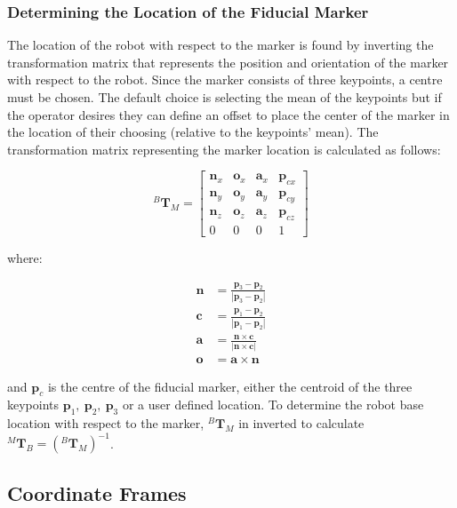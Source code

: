 \subsubsection{Determining the Location of the Fiducial Marker}

The location of the robot with respect to the marker is found by inverting the transformation matrix that represents the position and orientation of the marker with respect to the robot. Since the marker consists of three keypoints, a centre must be chosen. The default choice is selecting the mean of the keypoints but if the operator desires they can define an offset to place the center of the marker in the location of their choosing (relative to the keypoints' mean). The transformation matrix representing the marker location is calculated as follows:

\begin{equation}
    ^{B}\mathbf{T}_{M} = \begin{bmatrix}
    \mathbf{n}_x & \mathbf{o}_x & \mathbf{a}_x & \mathbf{p}_{cx}\\
   \mathbf{n}_y & \mathbf{o}_y & \mathbf{a}_y & \mathbf{p}_{cy}\\
   \mathbf{n}_z & \mathbf{o}_z & \mathbf{a}_z & \mathbf{p}_{cz}\\
   0 & 0 & 0 & 1\end{bmatrix}\label{eq:1}
\end{equation}

\noindent where:

\begin{align}
    \mathbf{n} &= \frac{\mathbf{p}_3 - \mathbf{p}_2}{|\mathbf{p}_3 - \mathbf{p}_2|}\\
    \mathbf{c} &= \frac{\mathbf{p}_1 - \mathbf{p}_2}{|\mathbf{p}_1 - \mathbf{p}_2|}\\
    \mathbf{a} &= \frac{\mathbf{n}\times\mathbf{c}}{|\mathbf{n}\times\mathbf{c}|}\\
    \mathbf{o} &= \mathbf{a}\times\mathbf{n}
\end{align}

\noindent and $\mathbf{p}_c$ is the centre of the fiducial marker, either the centroid of the three keypoints $\mathbf{p}_1,\ \mathbf{p}_2,\ \mathbf{p}_3$ or a user defined location. To determine the robot base location with respect to the marker, $^{B}\mathbf{T}_{M}$ in inverted to calculate $^{M}\mathbf{T}_{B} = (^{B}\mathbf{T}_{M})^{-1}$.\\

\subsection{Coordinate Frames}


